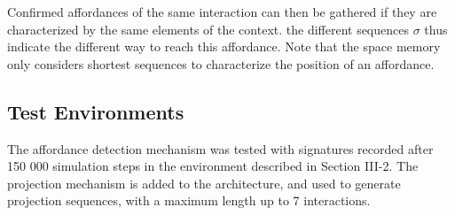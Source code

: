 \documentclass[conference]{IEEEtran}
\begin{document}
Confirmed affordances of the same interaction can then be gathered if they are characterized by the same elements of the context. the different sequences $\sigma$ thus indicate the different way to reach this affordance. Note that the space memory only considers shortest sequences to characterize the position of an affordance.







\subsection{Test Environments}

The affordance detection mechanism was tested with signatures recorded after 150 000 simulation steps in the environment described in Section III-2. The projection mechanism is added to the architecture, and used to generate projection sequences, with a maximum length up to 7 interactions.
\end{document}
